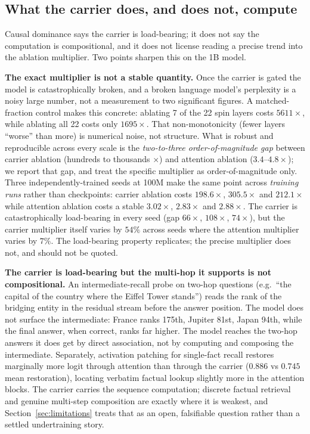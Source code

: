 \documentclass[10pt,twocolumn]{article}
\begin{document}
\subsection{What the carrier does, and does not, compute}
\label{sec:mechanism}
Causal dominance says the carrier is load-bearing; it does not say the computation is compositional, and it does not license reading a precise trend into the ablation multiplier. Two points sharpen this on the 1B model.

\textbf{The exact multiplier is not a stable quantity.} Once the carrier is gated the model is catastrophically broken, and a broken language model's perplexity is a noisy large number, not a measurement to two significant figures. A matched-fraction control makes this concrete: ablating 7 of the 22 spin layers costs $5611\times$, while ablating all 22 costs only $1695\times$. That non-monotonicity (fewer layers ``worse'' than more) is numerical noise, not structure. What is robust and reproducible across every scale is the \emph{two-to-three order-of-magnitude gap} between carrier ablation (hundreds to thousands $\times$) and attention ablation ($3.4$--$4.8\times$); we report that gap, and treat the specific multiplier as order-of-magnitude only. Three independently-trained seeds at 100M make the same point across \emph{training runs} rather than checkpoints: carrier ablation costs $198.6\times$, $305.5\times$ and $212.1\times$ while attention ablation costs a stable $3.02\times$, $2.83\times$ and $2.88\times$. The carrier is catastrophically load-bearing in every seed (gap $66\times$, $108\times$, $74\times$), but the carrier multiplier itself varies by $54\%$ across seeds where the attention multiplier varies by $7\%$. The load-bearing property replicates; the precise multiplier does not, and should not be quoted.

\textbf{The carrier is load-bearing but the multi-hop it supports is not compositional.} An intermediate-recall probe on two-hop questions (e.g.\ ``the capital of the country where the Eiffel Tower stands'') reads the rank of the bridging entity in the residual stream before the answer position. The model does not surface the intermediate: France ranks 175th, Jupiter 81st, Japan 94th, while the final answer, when correct, ranks far higher. The model reaches the two-hop answers it does get by direct association, not by computing and composing the intermediate. Separately, activation patching for single-fact recall restores marginally more logit through attention than through the carrier ($0.886$ vs $0.745$ mean restoration), locating verbatim factual lookup slightly more in the attention blocks. The carrier carries the sequence computation; discrete factual retrieval and genuine multi-step composition are exactly where it is weakest, and Section~\ref{sec:limitations} treats that as an open, falsifiable question rather than a settled undertraining story.
\end{document}

